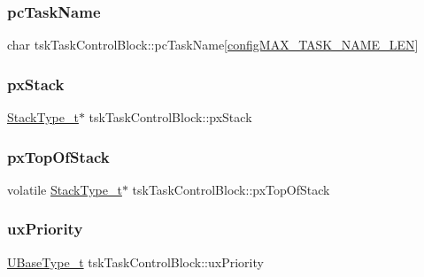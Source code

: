 \subsubsection{\texorpdfstring{pcTaskName}{pcTaskName}}
{\footnotesize\ttfamily char tsk\+Task\+Control\+Block\+::pc\+Task\+Name\mbox{[}\mbox{\hyperlink{_free_r_t_o_s_config_8h_ac388dc4041aab6997348828eb27fc1a8}{config\+M\+A\+X\+\_\+\+T\+A\+S\+K\+\_\+\+N\+A\+M\+E\+\_\+\+L\+EN}}\mbox{]}}

\mbox{\label{structtsk_task_control_block_a9a0d71a9f95dd0609f9911d9efd79134}} 
\subsubsection{\texorpdfstring{pxStack}{pxStack}}
{\footnotesize\ttfamily \mbox{\hyperlink{portmacro_8h_a84e9a8ba132feed0b2401c1f4e2ac63c}{Stack\+Type\+\_\+t}}$\ast$ tsk\+Task\+Control\+Block\+::px\+Stack}

\mbox{\label{structtsk_task_control_block_a429a186c7f8e34aba1eef5e12d215b90}} 
\subsubsection{\texorpdfstring{pxTopOfStack}{pxTopOfStack}}
{\footnotesize\ttfamily volatile \mbox{\hyperlink{portmacro_8h_a84e9a8ba132feed0b2401c1f4e2ac63c}{Stack\+Type\+\_\+t}}$\ast$ tsk\+Task\+Control\+Block\+::px\+Top\+Of\+Stack}

\mbox{\label{structtsk_task_control_block_a79187811e3d2a15595942e3b44237d85}} 
\subsubsection{\texorpdfstring{uxPriority}{uxPriority}}
{\footnotesize\ttfamily \mbox{\hyperlink{portmacro_8h_a646f89d4298e4f5afd522202b11cb2e6}{U\+Base\+Type\+\_\+t}} tsk\+Task\+Control\+Block\+::ux\+Priority}

